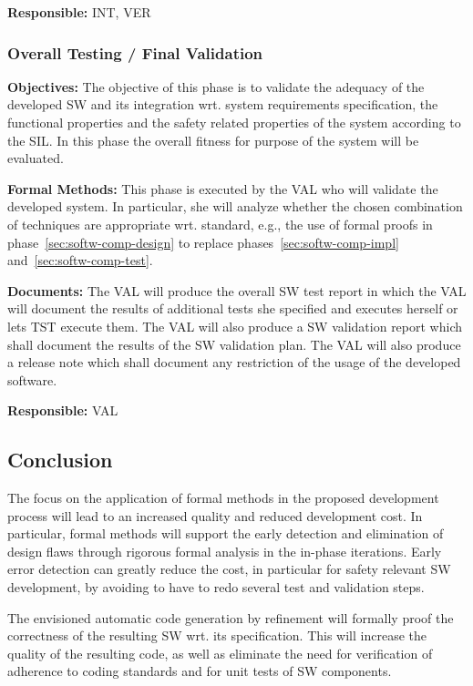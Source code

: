 {\bf Responsible:} INT, VER

\subsubsection{Overall Testing / Final Validation}
\label{sec:overall-testing-}

{\bf Objectives:} The objective of this phase is to validate the adequacy of the
developed SW and its integration wrt. system requirements specification, the
functional properties and the safety related properties of the system according
to the SIL. In this phase the overall fitness for purpose of the system will be
evaluated.

{\bf Formal Methods:} This phase is executed by the VAL who will validate the
developed system. In particular, she will analyze whether the chosen combination
of techniques are appropriate wrt. standard, e.g., the use of formal proofs in
phase~\ref{sec:softw-comp-design} to replace phases~\ref{sec:softw-comp-impl}
and~\ref{sec:softw-comp-test}.

{\bf Documents:} The VAL will produce the overall SW test report in which the
VAL will document the results of additional tests she specified and executes
herself or lets TST execute them. The VAL will also produce a SW validation
report which shall document the results of the SW validation plan. The VAL will
also produce a release note which shall document any restriction of the usage of
the developed software.

{\bf Responsible:} VAL


\subsection{Conclusion}
\label{sec:conclusion-fm-process}

The focus on the application of formal methods in the proposed development
process will lead to an increased quality and reduced development cost. In
particular, formal methods will support the early detection and elimination of
design flaws through rigorous formal analysis in the in-phase iterations. Early
error detection can greatly reduce the cost, in particular for safety relevant
SW development, by avoiding to have to redo several test and validation steps.

The envisioned automatic code generation by refinement will formally proof the
correctness of the resulting SW wrt. its specification. This will increase the
quality of the resulting code, as well as eliminate the need for verification of
adherence to coding standards and for unit tests of SW components.

